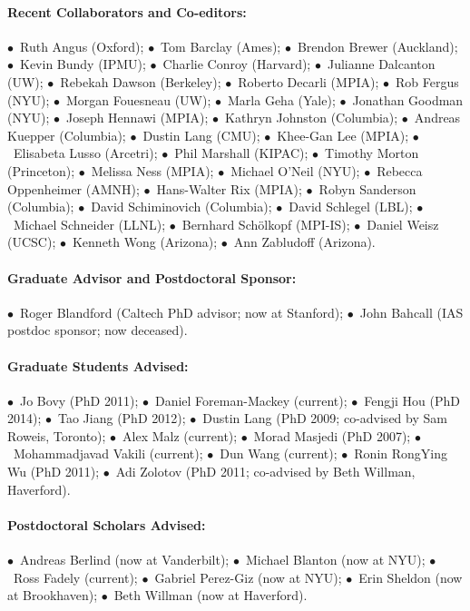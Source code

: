 \documentclass[12pt]{article}
\begin{document}
\paragraph{Recent Collaborators and Co-editors:}
$\bullet$~Ruth Angus (Oxford);
$\bullet$~Tom Barclay (Ames);
$\bullet$~Brendon Brewer (Auckland);
$\bullet$~Kevin Bundy (IPMU);
$\bullet$~Charlie Conroy (Harvard);
$\bullet$~Julianne Dalcanton (UW);
$\bullet$~Rebekah Dawson (Berkeley);
$\bullet$~Roberto Decarli (MPIA);
$\bullet$~Rob Fergus (NYU);
$\bullet$~Morgan Fouesneau (UW);
$\bullet$~Marla Geha (Yale);
$\bullet$~Jonathan Goodman (NYU);
$\bullet$~Joseph Hennawi (MPIA);
$\bullet$~Kathryn Johnston (Columbia);
$\bullet$~Andreas Kuepper (Columbia);
$\bullet$~Dustin Lang (CMU);
$\bullet$~Khee-Gan Lee (MPIA);
$\bullet$~Elisabeta Lusso (Arcetri);
$\bullet$~Phil Marshall (KIPAC);
$\bullet$~Timothy Morton (Princeton);
$\bullet$~Melissa Ness (MPIA);
$\bullet$~Michael O'Neil (NYU);
$\bullet$~Rebecca Oppenheimer (AMNH);
$\bullet$~Hans-Walter Rix (MPIA);
$\bullet$~Robyn Sanderson (Columbia);
$\bullet$~David Schiminovich (Columbia);
$\bullet$~David Schlegel (LBL);
$\bullet$~Michael Schneider (LLNL);
$\bullet$~Bernhard Sch\"olkopf (MPI-IS);
$\bullet$~Daniel Weisz (UCSC);
$\bullet$~Kenneth Wong (Arizona);
$\bullet$~Ann Zabludoff (Arizona).

\paragraph{Graduate Advisor and Postdoctoral Sponsor:}
$\bullet$~Roger Blandford (Caltech PhD advisor; now at Stanford);
$\bullet$~John Bahcall (IAS postdoc sponsor; now deceased).

\paragraph{Graduate Students Advised:}
$\bullet$~Jo Bovy (PhD 2011);
$\bullet$~Daniel Foreman-Mackey (current);
$\bullet$~Fengji Hou (PhD 2014);
$\bullet$~Tao Jiang (PhD 2012);
$\bullet$~Dustin Lang (PhD 2009; co-advised by Sam Roweis, Toronto);
$\bullet$~Alex Malz (current);
$\bullet$~Morad Masjedi (PhD 2007);
$\bullet$~Mohammadjavad Vakili (current);
$\bullet$~Dun Wang (current);
$\bullet$~Ronin RongYing Wu (PhD 2011);
$\bullet$~Adi Zolotov (PhD 2011; co-advised by Beth Willman, Haverford).

\paragraph{Postdoctoral Scholars Advised:}
$\bullet$~Andreas Berlind (now at Vanderbilt);
$\bullet$~Michael Blanton (now at NYU);
$\bullet$~Ross Fadely (current);
$\bullet$~Gabriel Perez-Giz (now at NYU);
$\bullet$~Erin Sheldon (now at Brookhaven);
$\bullet$~Beth Willman (now at Haverford).
\end{document}
